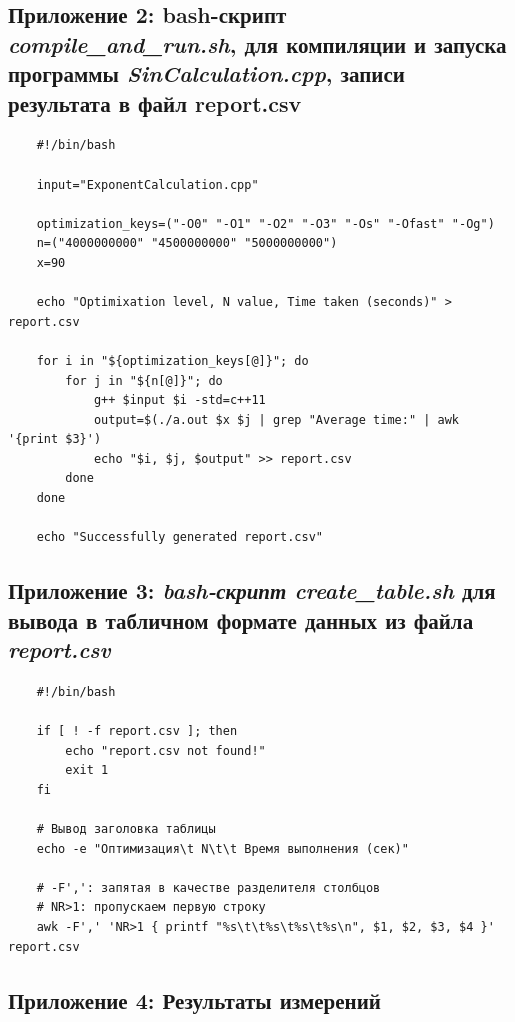 \documentclass[12pt,a4paper]{article}
\numberwithin{subsection}{section}
\begin{document}
\subsection*{Приложение 2: bash-скрипт \textit{compile\_and\_run.sh}, для компиляции и запуска программы 
\textit{SinCalculation.cpp}, записи результата в файл report.csv}

\begin{lstlisting}
    #!/bin/bash

    input="ExponentCalculation.cpp"

    optimization_keys=("-O0" "-O1" "-O2" "-O3" "-Os" "-Ofast" "-Og")
    n=("4000000000" "4500000000" "5000000000")
    x=90

    echo "Optimixation level, N value, Time taken (seconds)" > report.csv

    for i in "${optimization_keys[@]}"; do
        for j in "${n[@]}"; do
            g++ $input $i -std=c++11
            output=$(./a.out $x $j | grep "Average time:" | awk '{print $3}')
            echo "$i, $j, $output" >> report.csv
        done
    done

    echo "Successfully generated report.csv"
\end{lstlisting}


\subsection*{Приложение 3: \textit{bash-скрипт} \textit{create\_table.sh} для вывода в 
табличном формате данных из файла \textit{report.csv}}

\begin{verbatim}
    #!/bin/bash

    if [ ! -f report.csv ]; then
        echo "report.csv not found!"
        exit 1
    fi

    # Вывод заголовка таблицы
    echo -e "Оптимизация\t N\t\t Время выполнения (сек)"

    # -F',': запятая в качестве разделителя столбцов
    # NR>1: пропускаем первую строку
    awk -F',' 'NR>1 { printf "%s\t\t%s\t%s\t%s\n", $1, $2, $3, $4 }' report.csv

\end{verbatim}

\newpage


\subsection*{Приложение 4: Результаты измерений}
\end{document}
